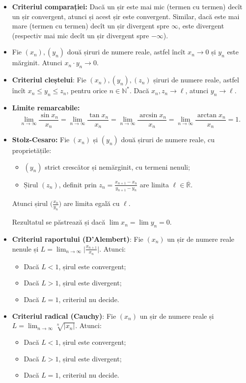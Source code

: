 \documentclass[11pt,a4paper]{article}
\newcommand\ds{\displaystyle}
\newcommand\NN{\mathbb{N}}
\newcommand\RR{\mathbb{R}}
\theoremstyle{dotless}
\theoremstyle{dotlessdr}
\begin{document}
\begin{itemize}
  \item \textbf{Criteriul comparației:} Dacă un șir este mai mic (termen cu termen) decît un șir
    convergent, atunci și acest șir este convergent. Similar, dacă este mai mare (termen cu termen)
    decît un șir divergent spre $\infty$, este divergent (respectiv mai mic decît un șir divergent
    spre $-\infty$).
  \item Fie $(x_n), (y_n)$ două șiruri de numere reale, astfel încît $x_n \to 0$ și $y_n$ este mărginit.
    Atunci $x_n \cdot y_n \to 0$.
  \item \textbf{Criteriul cleștelui}: Fie $(x_n), (y_n), (z_n)$ șiruri de numere reale, astfel încît
    $x_n \leq y_n \leq z_n$, pentru orice $n \in \NN^\ast$. Dacă $x_n, z_n \to \ell$, atunci $y_n \to \ell$.
  \item \textbf{Limite remarcabile:}
    \[
      \lim_{n \to \infty} \frac{\sin x_n}{x_n} = \lim_{n \to \infty} \frac{\tan x_n}{x_n} = %
      \lim_{n \to \infty} \frac{\arcsin x_n}{x_n} = \lim_{n \to \infty} \frac{\arctan x_n}{x_n} = 1.
    \]
  \item \textbf{Stolz-Cesaro:} Fie $(x_n)$ și $(y_n)$ două șiruri de numere reale, cu proprietățile:
    \begin{itemize}
      \item $(y_n)$ strict crescător și nemărginit, cu termeni nenuli;
      \item Șirul $(z_n)$, definit prin $z_n = \frac{x_{n + 1} - x_n}{y_{n + 1} - y_n}$ are limita
        $\ell \in \overline{\RR}$.
    \end{itemize}
     Atunci șirul $\Big( \frac{x_n}{y_n} \Big)$ are limita egală cu $\ell$.
     
     Rezultatul se păstrează și dacă $\lim x_n = \lim y_n = 0$.
   \item \textbf{Criteriul raportului (D'Alembert)}: Fie $(x_n)$ un șir de numere reale nenule și
     $L = \ds\lim_{n \to \infty} \Big| \frac{x_{n + 1}}{x_n} \Big|$. Atunci:
     \begin{itemize}
       \item Dacă $L < 1$, șirul este convergent;
       \item Dacă $L > 1$, șirul este divergent;
       \item Dacă $L = 1$, criteriul nu decide.
     \end{itemize}
   \item \textbf{Criteriul radical (Cauchy)}: Fie $(x_n)$ un șir de numere reale și
     $L = \ds\lim_{n \to \infty} \sqrt[n]{|x_n|}$. Atunci:
     \begin{itemize}
       \item Dacă $L < 1$, șirul este convergent;
       \item Dacă $L > 1$, șirul este divergent;
       \item Dacă $L = 1$, criteriul nu decide.
     \end{itemize}
\end{itemize}
\end{document}

